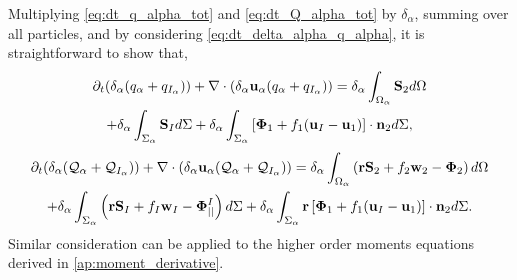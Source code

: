 Multiplying \ref{eq:dt_q_alpha_tot} and \ref{eq:dt_Q_alpha_tot} by $\delta_\alpha$, summing over all particles, and by considering \ref{eq:dt_delta_alpha_q_alpha}, it is straightforward to show that,
\begin{multline}
    \partial_t (\delta_\alpha (q_\alpha+q_{I_\alpha}))
    + \mathbf{\nabla} \cdot (\delta_\alpha\textbf{u}_\alpha(q_\alpha+q_{I_\alpha}))
    = \delta_\alpha\int_{\Omega_\alpha} \textbf{S}_2 d\Omega\\
    + \delta_\alpha\int_{\Sigma_\alpha} \textbf{S}_I d\Sigma
    + \delta_\alpha\int_{\Sigma_\alpha} \left[\mathbf{\Phi}_1 + f_1 (\textbf{u}_I-\textbf{u}_1) \right] \cdot \textbf{n}_2 d\Sigma,
    \label{eq:dt_dq_alpha_tot}
\end{multline}
\begin{multline}
    \partial_t (\delta_\alpha (\mathcal{Q}_\alpha+\mathcal{Q}_{I_\alpha}))
    + \mathbf{\nabla} \cdot (\delta_\alpha\textbf{u}_\alpha(\mathcal{Q}_\alpha+\mathcal{Q}_{I_\alpha}))
    = \delta_\alpha\int_{\Omega_\alpha} \left(
        \textbf{r} \textbf{S}_2         
        + f_2  \textbf{w}_2 
        - \mathbf{\Phi}_2
    \right) d\Omega\\
    + \delta_\alpha\int_{\Sigma_\alpha} \left(
        \textbf{r}\textbf{S}_I
        + f_I \textbf{w}_I
        - \mathbf{\Phi}_{||}^I
    \right) d\Sigma
    + \delta_\alpha\int_{\Sigma_\alpha} \textbf{r} \left[
        \mathbf{\Phi}_1
        + f_1 (\textbf{u}_I-\textbf{u}_1)
    \right]\cdot \textbf{n}_2  d\Sigma.
    \label{eq:dt_dQ_alpha_tot}
\end{multline}
Similar consideration can be applied to the higher order moments equations derived in \ref{ap:moment_derivative}.

